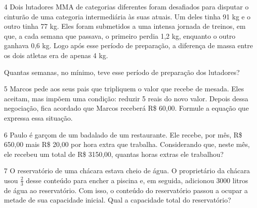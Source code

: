 \pagebreak
\num{4} Dois lutadores MMA de categorias diferentes foram desafiados para
disputar o cinturão de uma categoria intermediária às suas atuais. Um
deles tinha 91 kg e o outro tinha 77 kg. Eles foram submetidos a uma
intensa jornada de treinos, em que, a cada semana que passava, o primeiro
perdia 1,2 kg, enquanto o outro ganhava 0,6 kg. Logo após esse período de
preparação, a diferença de massa entre os dois atletas era de apenas 4 kg.

Quantas semanas, no mínimo, teve esse período de preparação dos
lutadores?

\begin{emptybox}
\end{emptybox}

\num{5} Marcos pede aos seus pais que tripliquem o valor que recebe de mesada.
Eles aceitam, mas impõem uma condição: reduzir 5 reais do novo valor. Depois 
dessa negociação, fica acordado que Marcos receberá R\$ 60,00. 
Formule a equação que expressa essa situação.

\begin{emptybox}
\end{emptybox}

\num{6} Paulo é garçom de um badalado de um restaurante. Ele recebe, por mês,
R\$ 650,00 mais R\$ 20,00 por hora extra que trabalha. Considerando que,
neste mês, ele recebeu um total de R\$ 3150,00, quantas horas extras ele 
trabalhou?

\begin{emptybox}
\end{emptybox}

\num{7} O reservatório de uma chácara estava cheio de água. O proprietário 
da chácara usou $\frac{2}{3}$ desse conteúdo para encher a piscina e, em seguida,
adicionou 3000 litros de água ao reservatório. Com isso, o conteúdo do
reservatório passou a ocupar a metade de sua capacidade inicial. Qual a
capacidade total do reservatório?

\begin{emptybox}
\end{emptybox}

